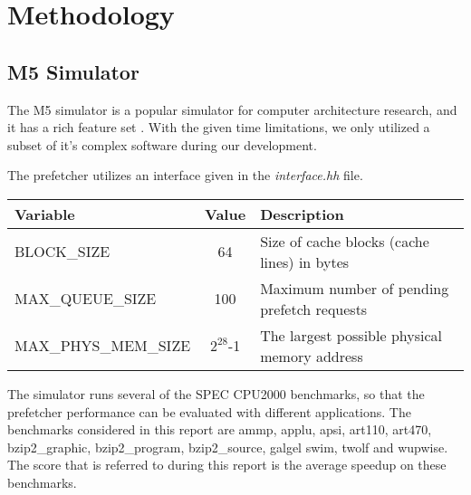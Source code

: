 \section{Methodology}

\subsection{M5 Simulator}

The M5 simulator is a popular simulator for computer architecture research, and
it has a rich feature set \cite{user_doc}. With the given time limitations, we only utilized a subset of it’s complex software during our development.


The prefetcher utilizes an interface given in the \emph{interface.hh} file. 
\begin{table}[h]
	\begin{tabularx}{\linewidth}{|X|c|X|}
	\hline 
	Variable & Value & Description \\ 
	\hline 
	BLOCK\_SIZE & 64 & Size of cache blocks (cache lines) in bytes \\ 
	\hline 
	MAX\_QUEUE\_SIZE & 100 & Maximum number of pending prefetch requests \\ 
	\hline 
	MAX\_PHYS\_MEM\_SIZE & $2^{28}$-1 & The largest possible physical memory address \\ 
	\hline 
	\end{tabularx} 
\end{table}






The simulator runs several of the SPEC CPU2000 benchmarks, so that the prefetcher
performance can be evaluated with different applications.
The benchmarks considered in this report are ammp, applu, apsi, art110, art470,
bzip2\_graphic, bzip2\_program, bzip2\_source, galgel swim, twolf and wupwise.
The score that is referred to during this report is the average speedup on these benchmarks.


